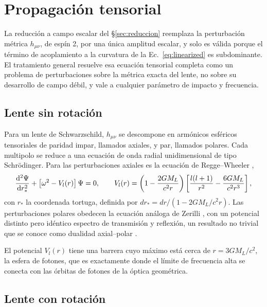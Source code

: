 \documentclass[11pt,a4paper,openany]{book}
\begin{document}
\section{Propagaci\'on tensorial}
\label{sec:tensorial}

La reducci\'on a campo escalar del \S\ref{sec:reduccion} reemplaza la
perturbaci\'on m\'etrica $h_{\mu\nu}$, de esp\'in 2, por una \'unica amplitud
escalar, y solo es v\'alida porque el t\'ermino de acoplamiento a la curvatura
de la Ec.~\eqref{eq:linearized} es subdominante. El tratamiento general
resuelve esa ecuaci\'on tensorial completa como un problema de perturbaciones
sobre la m\'etrica exacta del lente, no sobre su desarrollo de campo d\'ebil,
y vale a cualquier par\'ametro de impacto y frecuencia.

\subsection*{Lente sin rotaci\'on}

Para un lente de Schwarzschild, $h_{\mu\nu}$ se descompone en arm\'onicos
esf\'ericos tensoriales de paridad impar, llamados axiales, y par, llamados
polares. Cada multipolo se reduce a una ecuaci\'on de onda radial
unidimensional de tipo Schr\"odinger. Para las perturbaciones axiales es la
ecuaci\'on de Regge--Wheeler \citep{ReggeWheeler1957},
\begin{equation}
  \dv[2]{\Psi}{r_*}+\left[\omega^{2}-V_l(r)\right]\Psi=0,
  \qquad
  V_l(r)=\left(1-\frac{2GM_L}{c^{2}r}\right)
  \left[\frac{l(l+1)}{r^{2}}-\frac{6GM_L}{c^{2}r^{3}}\right],
  \label{eq:reggewheeler}
\end{equation}
con $r_*$ la coordenada tortuga, definida por
$dr_*=dr/(1-2GM_L/c^{2}r)$. Las perturbaciones polares obedecen la ecuaci\'on
an\'aloga de Zerilli \citep{Zerilli1970}, con un potencial distinto pero
id\'entico espectro de transmisi\'on y reflexi\'on, un resultado no trivial que
se conoce como dualidad axial--polar \citep{Chandrasekhar1983}.

El potencial $V_l(r)$ tiene una barrera cuyo m\'aximo est\'a cerca de
$r=3GM_L/c^{2}$, la esfera de fotones, que es exactamente donde el l\'imite de
frecuencia alta se conecta con las \'orbitas de fotones de la \'optica
geom\'etrica.

\subsection*{Lente con rotaci\'on}
\end{document}
